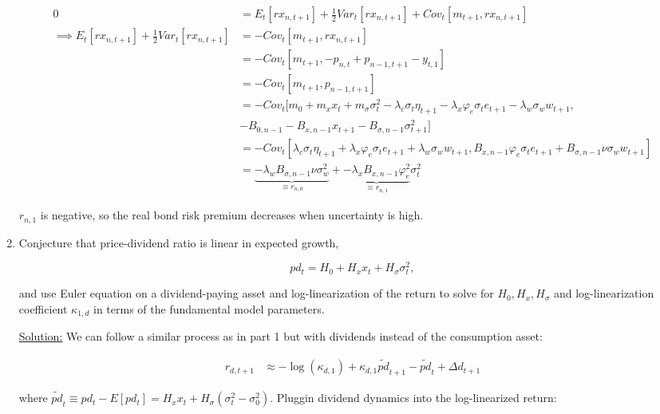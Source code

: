\documentclass{article}
\begin{document}
\begin{enumerate}
\begin{align*}
0 &= E_t[rx_{n,t+1}] + \frac{1}{2}Var_t[rx_{n,t+1}] + Cov_t[m_{t+1}, rx_{n, t+1}] \\
\implies
E_t[rx_{n,t+1}] + \frac{1}{2}Var_t[rx_{n,t+1}] 
&= - Cov_t[m_{t+1}, rx_{n, t+1}] \\
&= - Cov_t[m_{t+1}, -p_{n,t} + p_{n-1,t+1} - y_{t,1}]\\
&= - Cov_t[m_{t+1}, p_{n-1,t+1}]\\
&= - Cov_t[m_0 + m_x x_t + m_\sigma \sigma_t^2 - \lambda_c \sigma_t \eta_{t+1} - \lambda_x \varphi_e \sigma_t e_{t+1} - \lambda_w \sigma_w w_{t+1},\\& - B_{0, n-1} - B_{x,n-1} x_{t+1} - B_{\sigma,n-1} \sigma_{t+1}^2] \\
&= -Cov_t[ \lambda_c \sigma_t \eta_{t+1} + \lambda_x \varphi_e \sigma_t e_{t+1} + \lambda_w \sigma_w w_{t+1},
B_{x,n-1} \varphi_e \sigma_t e_{t+1} + B_{\sigma,n-1} \nu \sigma_w w_{t+1}] \\
&= \underbrace{-\lambda_w B_{\sigma,n-1} \nu \sigma_w^2}_{\equiv r_{n,0}} + \underbrace{-\lambda_x B_{x,n-1} \varphi_e^2}_{\equiv r_{n,1}} \sigma_t^2
\end{align*}

$r_{n,1}$ is negative, so the real bond risk premium decreases when uncertainty is high.

\pagebreak

\item Conjecture that price-dividend ratio is linear in expected growth, 

$$
pd_t = H_0 + H_x x_t + H_\sigma \sigma_t^2,
$$

and use Euler equation on a dividend-paying asset and log-linearization of the return to solve for $H_0, H_x, H_\sigma$ and log-linearization coefficient $\kappa_{1,d}$ in terms of the fundamental model parameters.

\bigskip

\underline{Solution:}  We can follow a similar process as in part 1 but with dividends instead of the consumption asset:

\begin{align*}
r_{d,t+1} &\approx - \log(\kappa_{d,1}) + \kappa_{d,1} \tilde{pd}_{t+1} - \tilde{pd}_t + \Delta d_{t+1}
\end{align*}

where $\tilde{pd}_t \equiv pd_t - E[pd_t] = H_x x_t + H_\sigma(\sigma_t^2 - \sigma_0^2)$. Pluggin dividend dynamics into the log-linearized return:


\end{enumerate}
\end{document}
